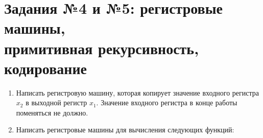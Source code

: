 \documentclass[12pt,a4paper]{article}
\begin{document}
\section*{Задания №4 и №5: регистровые машины,\\ примитивная рекурсивность, кодирование}

\begin{enumerate}[itemsep=3pt]

\item Написать регистровую машину, которая копирует значение входного регистра $x_2$ 
в выходной регистр $x_1$. Значение входного регистра в конце работы поменяться не должно.

\item Написать регистровые машины для вычисления следующих функций:
  \begin{enumerate}
  \end{enumerate}


\end{enumerate}
\end{document}
